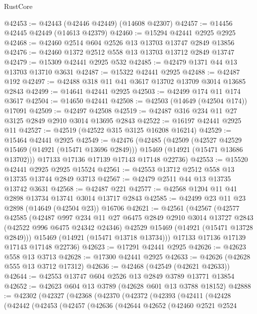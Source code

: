 \begin{lexlean}{RustCore}
\begin{coremodule}
@42453 := @42443 (@42446 @42449) (@14608 @42307)
@42457 := @14456 @42445 @42449 (@14613 @42379)
@42460 := @15294 @42441 @2925 @2925
@42468 := @42460 @2514 @604 @2526 @13 @13703 @13747 @2849 @13856
@42476 := @42460 @1372 @2512 @558 @13 @13703 @13712 @2849 @13747
@42479 := @15309 @42441 @2925 @532
@42485 := @42479 @1371 @44 @13 @13703 @13710 @3631
@42487 := @15322 @42441 @2925
@42488 := @42487 @192
@42497 := @42488 @318 @11 @41 @3617 @13702 @13709 @3014 @13685 @2843
@42499 := @14641 @42441 @2925
@42503 := @42499 @174 @11 @174 @3617
@42504 := @14650 @42441
@42508 := @42503 (@14649 (@42504 @174)) @17091
@42509 := @42497 @42508
@42519 := @42487 @316 @234 @11 @27 @3125 @2849 @2910 @3014 @13695 @2843
@42522 := @16197 @42441 @2925 @11
@42527 := @42519 (@42522 @315 @3125 @16208 @16214)
@42529 := @15464 @42441 @2925
@42549 := @42476
    (@42485
      (@42509
        (@42527 @42529 @15469 (@14921 (@15471 @13696 @2849)))
        @15469
        (@14921 (@15471 @13686 @13702)))
      @17133
      @17136
      @17139
      @17143
      @17148
      @22736)
@42553 := @15520 @42441 @2925 @2925 @15524
@42561 := @42553 @13712 @2512 @558 @13 @13735 @13744 @2849 @3713
@42567 := @42479 @2511 @44 @13 @13735 @13742 @3631
@42568 := @42487 @221
@42577 := @42568 @1204 @11 @41 @2898 @13734 @13741 @3014 @13717 @2843
@42585 := @42499 @23 @11 @23 @2898 (@14649 (@42504 @23)) @16706
@42621 := @42561
    (@42567
      (@42577
        @42585
        (@42487
          @997
          @234
          @11
          @27
          @6475
          @2849
          @2910
          @3014
          @13727
          @2843
          (@42522 @996 @6475 @24342 @24346)
          @42529
          @15469
          (@14921 (@15471 @13728 @2849)))
        @15469
        (@14921 (@15471 @13718 @13734)))
      @17133
      @17136
      @17139
      @17143
      @17148
      @22736)
@42623 := @17291 @42441 @2925
@42626 := @42623 @558 @13 @3713
@42628 := @17300 @42441 @2925
@42633 := @42626 (@42628 @555 @13 @3712 @17312)
@42636 := @42468 (@42549 (@42621 @42633))
@42644 := @42553 @13747 @604 @2526 @13 @2849 @3789 @13771 @13854
@42652 := @42623 @604 @13 @3789 (@42628 @601 @13 @3788 @18152)
@42888 := @42302
    (@42327
      (@42368
        (@42370
          (@42372
            (@42393
              (@42411
                (@42428
                  (@42442
                    (@42453
                      (@42457
                        (@42636
                          (@42644
                            @42652
                            (@42460
                              @2521
                              @2524

\end{coremodule}
\end{lexlean}
